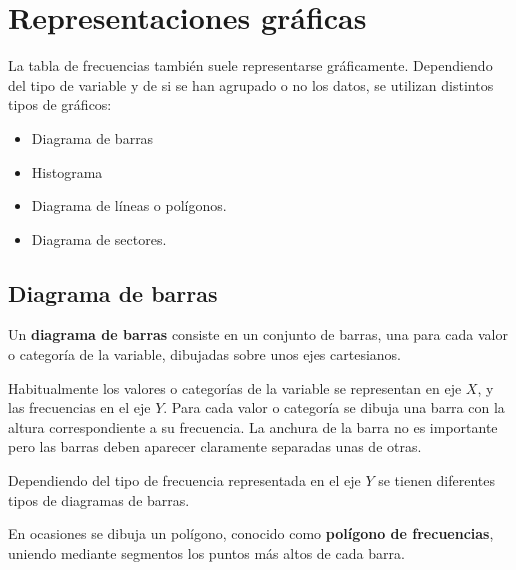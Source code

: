 \documentclass[
  spanish,
  a4paper,
]{scrreport}
\theoremstyle{plain}
\theoremstyle{definition}
\theoremstyle{definition}
\theoremstyle{remark}
\begin{document}
\section{Representaciones gráficas}\label{representaciones-gruxe1ficas}

La tabla de frecuencias también suele representarse gráficamente.
Dependiendo del tipo de variable y de si se han agrupado o no los datos,
se utilizan distintos tipos de gráficos:

\begin{itemize}
\item
  Diagrama de barras
\item
  Histograma
\item
  Diagrama de líneas o polígonos.
\item
  Diagrama de sectores.
\end{itemize}

\subsection{Diagrama de barras}\label{diagrama-de-barras}

Un \textbf{diagrama de barras} consiste en un conjunto de barras, una
para cada valor o categoría de la variable, dibujadas sobre unos ejes
cartesianos.

Habitualmente los valores o categorías de la variable se representan en
eje \(X\), y las frecuencias en el eje \(Y\). Para cada valor o
categoría se dibuja una barra con la altura correspondiente a su
frecuencia. La anchura de la barra no es importante pero las barras
deben aparecer claramente separadas unas de otras.

Dependiendo del tipo de frecuencia representada en el eje \(Y\) se
tienen diferentes tipos de diagramas de barras.

En ocasiones se dibuja un polígono, conocido como \textbf{polígono de
frecuencias}, uniendo mediante segmentos los puntos más altos de cada
barra.
\end{document}

